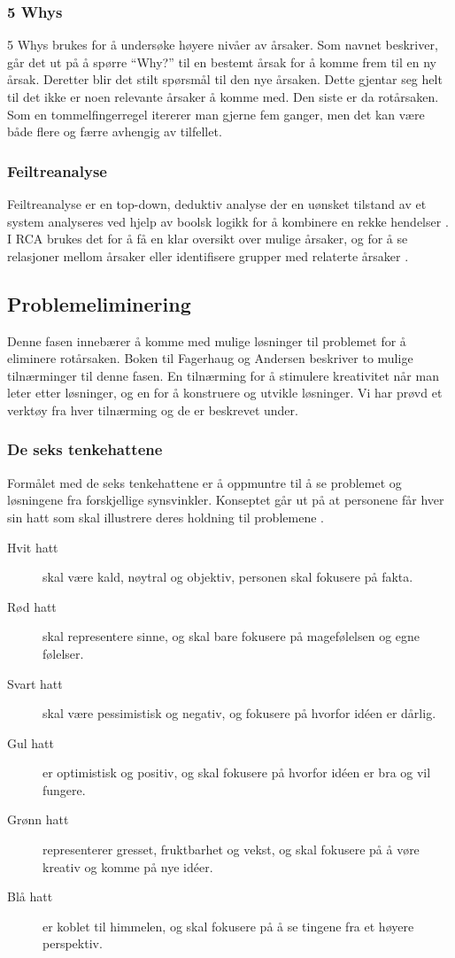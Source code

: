 \subsubsection{5 Whys}
5 Whys brukes for å undersøke høyere nivåer av årsaker. Som navnet beskriver, går det ut på å spørre ``Why?'' til en bestemt årsak for å komme frem til en ny årsak. Deretter blir det stilt spørsmål til den nye årsaken. Dette gjentar seg helt til det ikke er noen relevante årsaker å komme med. Den siste er da rotårsaken. Som en tommelfingerregel itererer man gjerne fem ganger, men det kan være både flere og færre avhengig av tilfellet. 

\subsubsection{Feiltreanalyse}
Feiltreanalyse er en top-down, deduktiv analyse der en uønsket tilstand av et system analyseres ved hjelp av boolsk logikk for å kombinere en rekke hendelser \cite{wiki:faulttree}. I RCA brukes det for å få en klar oversikt over mulige årsaker, og for å se relasjoner mellom årsaker eller identifisere grupper med relaterte årsaker \cite{RCA}. 

\subsection{Problemeliminering}
Denne fasen innebærer å komme med mulige løsninger til problemet for å eliminere rotårsaken. Boken til Fagerhaug og Andersen \cite{RCA} beskriver to mulige tilnærminger til denne fasen. En tilnærming for å stimulere kreativitet når man leter etter løsninger, og en for å konstruere og utvikle løsninger. Vi har prøvd et verktøy fra hver tilnærming og de er beskrevet under. 

\subsubsection{De seks tenkehattene}
Formålet med de seks tenkehattene er å oppmuntre til å se problemet og løsningene fra forskjellige synsvinkler. Konseptet går ut på at personene får hver sin hatt som skal illustrere deres holdning til problemene \cite{RCA}. 

\begin{description}
    \item[Hvit hatt] skal være kald, nøytral og objektiv, personen skal fokusere på fakta.
    \item[Rød hatt] skal representere sinne, og skal bare fokusere på magefølelsen og egne følelser.
    \item[Svart hatt] skal være pessimistisk og negativ, og fokusere på hvorfor idéen er dårlig.
    \item[Gul hatt] er optimistisk og positiv, og skal fokusere på hvorfor idéen er bra og vil fungere.
    \item[Grønn hatt] representerer gresset, fruktbarhet og vekst, og skal fokusere på å vøre kreativ og komme på nye idéer.
    \item[Blå hatt] er koblet til himmelen, og skal fokusere på å se tingene fra et høyere perspektiv.
\end{description}

